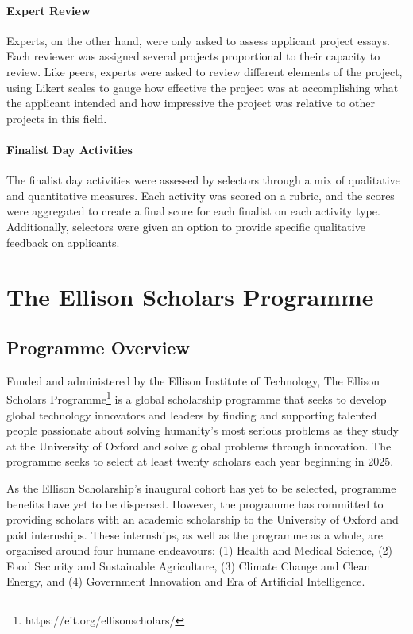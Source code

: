 \paragraph{Expert Review} 
Experts, on the other hand, were only asked to assess applicant project essays. Each reviewer was assigned several projects proportional to their capacity to review. Like peers, experts were asked to review different elements of the project, using Likert scales to gauge how effective the project was at accomplishing what the applicant intended and how impressive the project was relative to other projects in this field. 

\paragraph{Finalist Day Activities}
The finalist day activities were assessed by selectors through a mix of qualitative and quantitative measures. Each activity was scored on a rubric, and the scores were aggregated to create a final score for each finalist on each activity type. Additionally, selectors were given an option to provide specific qualitative feedback on applicants.

\section{The Ellison Scholars Programme}\label{ssec:ellison}
\subsection{Programme Overview}
Funded and administered by the Ellison Institute of Technology, The Ellison Scholars Programme\footnote{https://eit.org/ellisonscholars/} is a global scholarship programme that seeks to develop global technology innovators and leaders by finding and supporting talented people passionate about solving humanity’s most serious problems as they study at the University of Oxford and solve global problems through innovation. The programme seeks to select at least twenty scholars each year beginning in 2025.

As the Ellison Scholarship's inaugural cohort has yet to be selected, programme benefits have yet to be dispersed. However, the programme has committed to providing scholars with an academic scholarship to the University of Oxford and paid internships. These internships, as well as the programme as a whole, are organised around four humane endeavours: (1) Health and Medical Science, (2) Food Security and Sustainable Agriculture, (3) Climate Change and Clean Energy, and (4) Government Innovation and Era of Artificial Intelligence.

